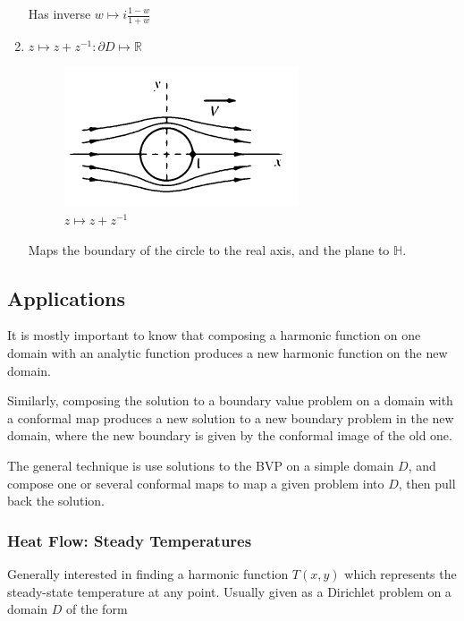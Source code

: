 \documentclass{article}
\begin{document}
\begin{enumerate}
    Has inverse $w \mapsto i\frac{1-w}{1+w}$
    
    \item $z\mapsto z + z^{-1}: \partial D \mapsto \mathbb{R}$
    
    \begin{figure}[H]
        \centering
        \includegraphics[width=0.5\linewidth]{fluid-cylinder}
        \caption{$z \mapsto z+z^{-1}$}
    \end{figure}
    
    Maps the boundary of the circle to the real axis, and the plane to $\mathbb{H}$.
    
    

   
\end{enumerate}

\subsection{Applications}

It is mostly important to know that composing a harmonic function on one domain with an analytic function produces a new harmonic function on the new domain.

Similarly, composing the solution to a boundary value problem on a domain with a conformal map produces a new solution to a new boundary problem in the new domain, where the new boundary is given by the conformal image of the old one.

The general technique is use solutions to the BVP on a simple domain $D$, and compose one or several conformal maps to map a given problem into $D$, then pull back the solution.

\subsubsection{Heat Flow: Steady Temperatures}

Generally interested in finding a harmonic function $T(x,y)$ which represents the steady-state temperature at any point. Usually given as a Dirichlet problem on a domain $D$ of the form
\end{document}
